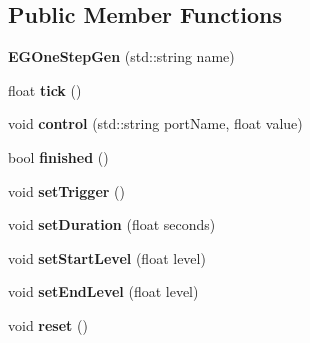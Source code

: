 \subsection*{Public Member Functions}
\begin{DoxyCompactItemize}
\item 
\hypertarget{classunit_1_1EGOneStepGen_a9bc697acabed6c7b0467369ba073ede1}{{\bfseries E\-G\-One\-Step\-Gen} (std\-::string name)}\label{classunit_1_1EGOneStepGen_a9bc697acabed6c7b0467369ba073ede1}

\item 
\hypertarget{classunit_1_1EGOneStepGen_a74df96649d7a66d19cb33bf9bf13f54a}{float {\bfseries tick} ()}\label{classunit_1_1EGOneStepGen_a74df96649d7a66d19cb33bf9bf13f54a}

\item 
\hypertarget{classunit_1_1EGOneStepGen_a8979594fb226c732a9b8232664f09047}{void {\bfseries control} (std\-::string port\-Name, float value)}\label{classunit_1_1EGOneStepGen_a8979594fb226c732a9b8232664f09047}

\item 
\hypertarget{classunit_1_1EGOneStepGen_ae9f187e0f266559a80e4f4b534d79f78}{bool {\bfseries finished} ()}\label{classunit_1_1EGOneStepGen_ae9f187e0f266559a80e4f4b534d79f78}

\item 
\hypertarget{classunit_1_1EGOneStepGen_af94a0976e166a3f53b7bf14de58f81d6}{void {\bfseries set\-Trigger} ()}\label{classunit_1_1EGOneStepGen_af94a0976e166a3f53b7bf14de58f81d6}

\item 
\hypertarget{classunit_1_1EGOneStepGen_aaf02138e168cad06cb955944f57ce93c}{void {\bfseries set\-Duration} (float seconds)}\label{classunit_1_1EGOneStepGen_aaf02138e168cad06cb955944f57ce93c}

\item 
\hypertarget{classunit_1_1EGOneStepGen_af2b5bd8522fac9dc997d78d3750cdbbb}{void {\bfseries set\-Start\-Level} (float level)}\label{classunit_1_1EGOneStepGen_af2b5bd8522fac9dc997d78d3750cdbbb}

\item 
\hypertarget{classunit_1_1EGOneStepGen_a3d58403aa5bebffeaf3f326855e0a233}{void {\bfseries set\-End\-Level} (float level)}\label{classunit_1_1EGOneStepGen_a3d58403aa5bebffeaf3f326855e0a233}

\item 
\hypertarget{classunit_1_1EGOneStepGen_a4898b08a0687e03802abdb7945708cab}{void {\bfseries reset} ()}\label{classunit_1_1EGOneStepGen_a4898b08a0687e03802abdb7945708cab}

\end{DoxyCompactItemize}
